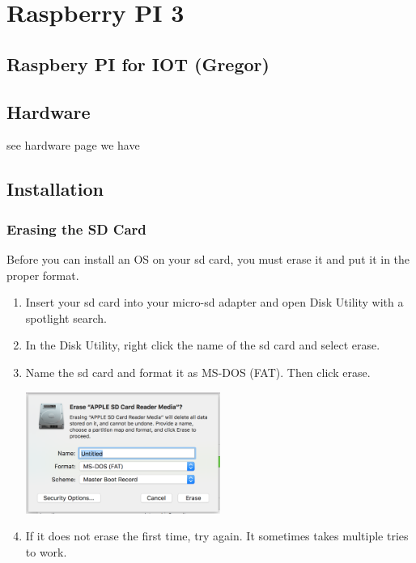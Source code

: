 \FILENAME

\section{Raspberry PI 3}\label{raspberry-pi-3}

\subsection{Raspbery PI for IOT
(Gregor)}\label{raspbery-pi-for-iot-gregor}

\subsection{Hardware}\label{hardware}

see hardware page we have

\subsection{Installation}\label{installation}

\subsubsection{Erasing the SD Card}\label{erasing-the-sd-card}

Before you can install an OS on your sd card, you must erase it and put
it in the proper format.

\begin{enumerate}
\def\labelenumi{\arabic{enumi}.}
\tightlist
\item
  Insert your sd card into your micro-sd adapter and open Disk Utility
  with a spotlight search.
\item
  In the Disk Utility, right click the name of the sd card and select
  erase.
\item
  Name the sd card and format it as MS-DOS (FAT). Then click erase.

  \includegraphics[width=0.5\textwidth]{images/diskutil.png}

\item
  If it does not erase the first time, try again. It sometimes takes
  multiple tries to work.
\end{enumerate}

